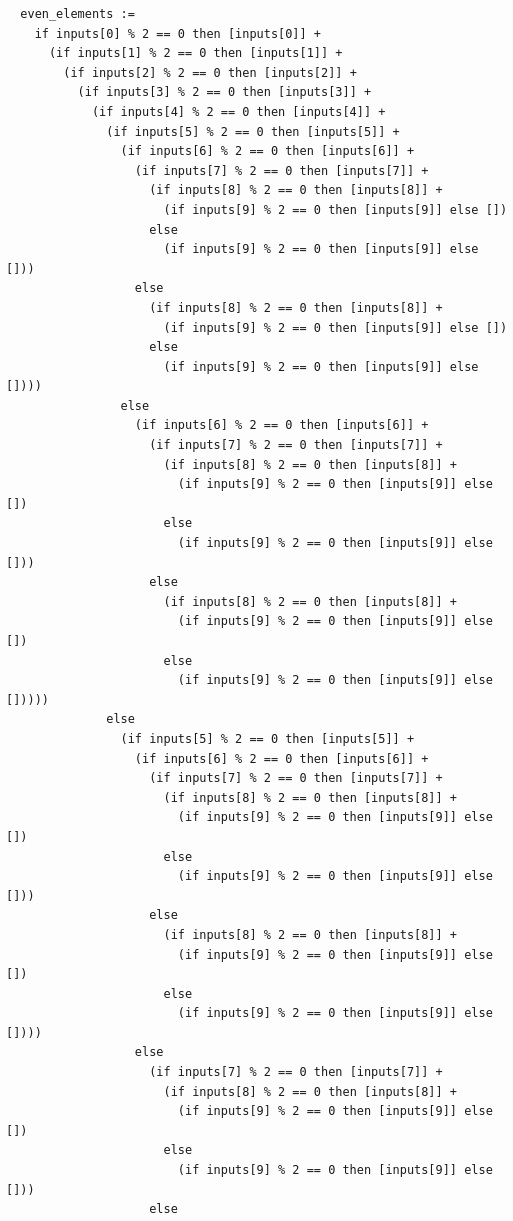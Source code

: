 \documentclass{article}
\begin{document}
\begin{lstlisting}
  even_elements :=
    if inputs[0] % 2 == 0 then [inputs[0]] +
      (if inputs[1] % 2 == 0 then [inputs[1]] +
        (if inputs[2] % 2 == 0 then [inputs[2]] +
          (if inputs[3] % 2 == 0 then [inputs[3]] +
            (if inputs[4] % 2 == 0 then [inputs[4]] +
              (if inputs[5] % 2 == 0 then [inputs[5]] +
                (if inputs[6] % 2 == 0 then [inputs[6]] +
                  (if inputs[7] % 2 == 0 then [inputs[7]] +
                    (if inputs[8] % 2 == 0 then [inputs[8]] +
                      (if inputs[9] % 2 == 0 then [inputs[9]] else [])
                    else
                      (if inputs[9] % 2 == 0 then [inputs[9]] else []))
                  else
                    (if inputs[8] % 2 == 0 then [inputs[8]] +
                      (if inputs[9] % 2 == 0 then [inputs[9]] else [])
                    else
                      (if inputs[9] % 2 == 0 then [inputs[9]] else [])))
                else
                  (if inputs[6] % 2 == 0 then [inputs[6]] +
                    (if inputs[7] % 2 == 0 then [inputs[7]] +
                      (if inputs[8] % 2 == 0 then [inputs[8]] +
                        (if inputs[9] % 2 == 0 then [inputs[9]] else [])
                      else
                        (if inputs[9] % 2 == 0 then [inputs[9]] else []))
                    else
                      (if inputs[8] % 2 == 0 then [inputs[8]] +
                        (if inputs[9] % 2 == 0 then [inputs[9]] else [])
                      else
                        (if inputs[9] % 2 == 0 then [inputs[9]] else []))))
              else
                (if inputs[5] % 2 == 0 then [inputs[5]] +
                  (if inputs[6] % 2 == 0 then [inputs[6]] +
                    (if inputs[7] % 2 == 0 then [inputs[7]] +
                      (if inputs[8] % 2 == 0 then [inputs[8]] +
                        (if inputs[9] % 2 == 0 then [inputs[9]] else [])
                      else
                        (if inputs[9] % 2 == 0 then [inputs[9]] else []))
                    else
                      (if inputs[8] % 2 == 0 then [inputs[8]] +
                        (if inputs[9] % 2 == 0 then [inputs[9]] else [])
                      else
                        (if inputs[9] % 2 == 0 then [inputs[9]] else [])))
                  else
                    (if inputs[7] % 2 == 0 then [inputs[7]] +
                      (if inputs[8] % 2 == 0 then [inputs[8]] +
                        (if inputs[9] % 2 == 0 then [inputs[9]] else [])
                      else
                        (if inputs[9] % 2 == 0 then [inputs[9]] else []))
                    else

\end{lstlisting}
\end{document}
